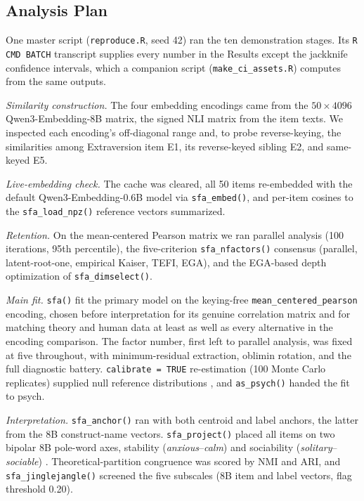 \subsection{Analysis Plan}

One master script (\texttt{reproduce.R}, seed 42) ran the ten demonstration stages. Its \texttt{R CMD BATCH} transcript supplies every number in the Results except the jackknife confidence intervals, which a companion script (\texttt{make\_ci\_assets.R}) computes from the same outputs.

\emph{Similarity construction.} The four embedding encodings came from the $50 \times 4096$ Qwen3-Embedding-8B matrix, the signed NLI matrix from the item texts. We inspected each encoding's off-diagonal range and, to probe reverse-keying, the similarities among Extraversion item E1, its reverse-keyed sibling E2, and same-keyed E5.

\emph{Live-embedding check.} The cache was cleared, all 50 items re-embedded with the default Qwen3-Embedding-0.6B model via \texttt{sfa\_embed()}, and per-item cosines to the \texttt{sfa\_load\_npz()} reference vectors summarized.

\emph{Retention.} On the mean-centered Pearson matrix we ran parallel analysis (100 iterations, 95th percentile), the five-criterion \texttt{sfa\_nfactors()} consensus (parallel, latent-root-one, empirical Kaiser, TEFI, EGA), and the EGA-based depth optimization of \texttt{sfa\_dimselect()}.

\emph{Main fit.} \texttt{sfa()} fit the primary model on the keying-free \texttt{mean\_centered\_pearson} encoding, chosen before interpretation for its genuine correlation matrix and for matching theory and human data at least as well as every alternative in the encoding comparison. The factor number, first left to parallel analysis, was fixed at five throughout, with minimum-residual extraction, oblimin rotation, and the full diagnostic battery. \texttt{calibrate = TRUE} re-estimation (100 Monte Carlo replicates) supplied null reference distributions \citep{pokropek-2026}, and \texttt{as\_psych()} handed the fit to psych.

\emph{Interpretation.} \texttt{sfa\_anchor()} ran with both centroid and label anchors, the latter from the 8B construct-name vectors. \texttt{sfa\_project()} placed all items on two bipolar 8B pole-word axes, stability (\emph{anxious}--\emph{calm}) and sociability (\emph{solitary}--\emph{sociable}) \citep{grand-etal-2022}. Theoretical-partition congruence was scored by NMI and ARI, and \texttt{sfa\_jinglejangle()} screened the five subscales (8B item and label vectors, flag threshold 0.20).

